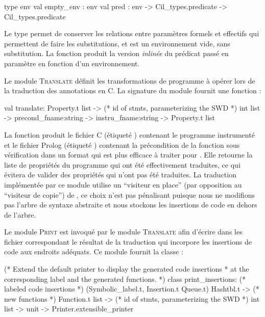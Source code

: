 \begin{ocamlcode}
type env
val empty_env : env
val pred : env -> Cil_types.predicate -> Cil_types.predicate
\end{ocamlcode}

Le type  permet de conserver les relations entre paramètres
formels et effectifs qui permettent de faire les substitutions, et
 est un environnement vide, sans substitution.
La fonction  produit la version {\em inlinée} du prédicat
passé en paramètre en fonction d'un environnement.

Le module \textsc{Translate} définit les transformations de programme à opérer
lors de la traduction des annotations \eacsl en C.
La signature du module fournit une fonction :

\begin{ocamlcode}
val translate:
  Property.t list ->
  (* id of stmts, parameterizing the SWD *)
  int list ->
  precond_fname:string ->
  instru_fname:string ->
  Property.t list
\end{ocamlcode}

La fonction  produit le fichier C (étiqueté
) contenant le programme instrumenté et le fichier
Prolog (étiqueté ) contenant la précondition de la
fonction sous vérification dans un format qui est plus efficace à traiter pour
\pathcrawler.
Elle retourne la liste de propriétés du programme qui ont été effectivement
traduites, ce qui évitera de valider des propriétés qui n'ont pas été traduites.
La traduction implémentée par ce module utilise un ``visiteur en place'' (par
opposition au ``visiteur de copie'') de \framac, ce choix n'est pas pénalisant
puisque nous ne modifions pas l'arbre de syntaxe abstraite et nous stockons les
insertions de code en dehors de l'arbre.

Le module \textsc{Print} est invoqué par le module \textsc{Translate} afin
d'écrire dans les fichier correspondant le résultat de la traduction qui
incorpore les insertions de code aux endroits adéquats.
Ce module fournit la classe :

\begin{ocamlcode}
(* Extend the default printer to display the generated code insertions
 * at the corresponding label and the generated functions. *)
class print_insertions:
	(* labeled code insertions *)
	(Symbolic_label.t, Insertion.t Queue.t) Hashtbl.t ->
	(* new functions *)
	Function.t list ->
	(* id of stmts, parameterizing the SWD *)
	int list ->
	unit ->
	Printer.extensible_printer
\end{ocamlcode}


